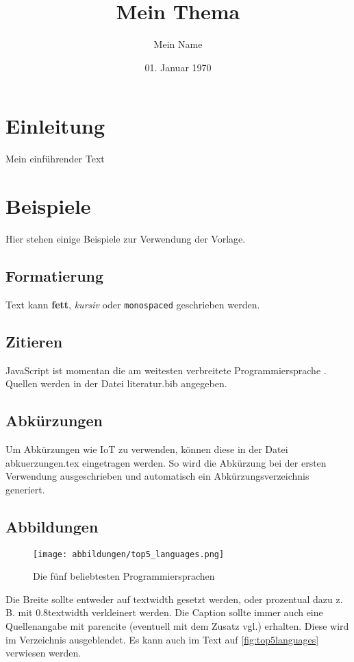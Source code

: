 \documentclass[a4paper,12pt]{scrreprt}
\title{Mein Thema}
\author{Mein Name}
\date{01. Januar 1970}
\begin{document}

\tableofcontents
\listoffigures
\listoftables
\listoflistings

\clearpage

\onehalfspacing
\chapter{Einleitung}
Mein einführender Text

\chapter{Beispiele}
Hier stehen einige Beispiele zur Verwendung der Vorlage.

\section{Formatierung}
Text kann \textbf{fett}, \textit{kursiv} oder \texttt{monospaced} geschrieben werden.

\section{Zitieren}
JavaScript ist momentan die am weitesten verbreitete Programmiersprache \parencite{stackOverflowSurvey}.
Quellen werden in der Datei literatur.bib angegeben.

\section{Abkürzungen}
Um Abkürzungen wie \ac{IoT} zu verwenden, können diese in der Datei abkuerzungen.tex eingetragen werden.
So wird die Abkürzung bei der ersten Verwendung ausgeschrieben und automatisch ein Abkürzungsverzeichnis generiert.

\section{Abbildungen}
\begin{figure}[h]
    \centering
    \texttt{[image: abbildungen/top5\_languages.png]}
    \caption{Die fünf beliebtesten Programmiersprachen \parencite{stackOverflowSurvey}}
    \label{fig:top5languages}
\end{figure}

Die Breite sollte entweder auf textwidth gesetzt werden, oder prozentual dazu z. B. mit 0.8textwidth verkleinert werden.
Die Caption sollte immer auch eine Quellenangabe mit parencite (eventuell mit dem Zusatz vgl.) erhalten.
Diese wird im Verzeichnis ausgeblendet.
Es kann auch im Text auf \autoref{fig:top5languages} verwiesen werden.
\end{document}
